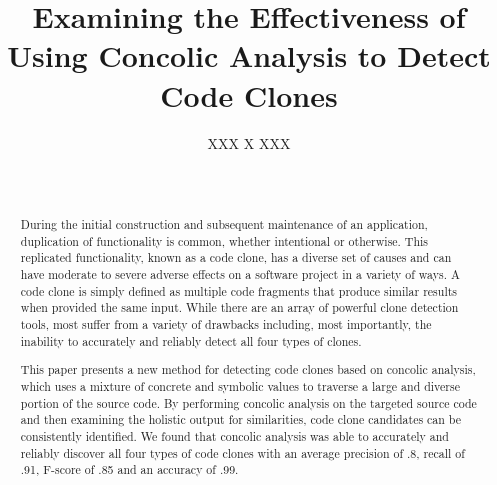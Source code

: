 \documentclass{sig-alternate}
\newif\ifisnopii
\begin{document}
%

\title{Examining the Effectiveness of Using Concolic Analysis to Detect Code Clones}
%
\ifisnopii %
\author{
%
\alignauthor
Daniel E. Krutz and Samuel A. Malachowsky\\ 	
	\affaddr{Software Engineering Department}\\
       \affaddr{Rochester Institute of Technology}\\
       \affaddr{1 Lomb Memorial Drive}\\
       \affaddr{Rochester, NY 14623} \\
       \email{\{dxkvse, samvse\}@rit.edu}
} %
\else %
\author{
\alignauthor
XXX X XXX\\
       \\
       \\
}
\fi %

\maketitle
\begin{abstract}
During the initial construction and subsequent maintenance of an application, duplication of functionality is common, whether intentional or otherwise. This replicated functionality, known as a code clone, has a diverse set of causes and can have moderate to severe adverse effects on a software project in a variety of ways. A code clone is simply defined as multiple code fragments that produce similar results when provided the same input. While there are an array of powerful clone detection tools, most suffer from a variety of drawbacks including, most importantly, the inability to accurately and reliably detect all four types of clones.

This paper presents a new method for detecting code clones based on concolic analysis, which uses a mixture of concrete and symbolic values to traverse a large and diverse portion of the source code. By performing concolic analysis on the targeted source code and then examining the holistic output for similarities, code clone candidates can be consistently identified. We found that concolic analysis was able to accurately and reliably discover all four types of code clones with an average precision of .8, recall of .91, F-score of .85 and an accuracy of .99.

\end{abstract}
\end{document}
